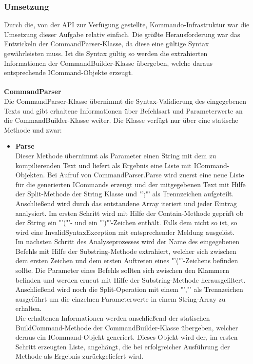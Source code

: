 \subsubsection{Umsetzung}
Durch die, von der API zur Verfügung gestellte, Kommando-Infrastruktur war die Umsetzung dieser Aufgabe relativ einfach. Die größte Herausforderung war das Entwickeln der CommandParser-Klasse, da diese eine gültige Syntax gewährleisten muss. Ist die Syntax gültig so werden die extrahierten Informationen der CommandBuilder-Klasse übergeben, welche daraus entsprechende ICommand-Objekte erzeugt.\\
\\
\textbf{CommandParser}\\
Die CommandParser-Klasse übernimmt die Syntax-Validierung des eingegebenen Texts und gibt erhaltene Informationen über Befehlsart und Parameterwerte an die CommandBuilder-Klasse weiter. Die Klasse verfügt nur über eine statische Methode und zwar:
\begin{itemize}
\item \textbf{Parse}\\
Dieser Methode übernimmt als Parameter einen String mit dem zu kompilierenden Text und liefert als Ergebnis eine Liste mit ICommand-Objekten. 
Bei Aufruf von CommandParser.Parse wird zuerst eine neue Liste für die generierten ICommands erzeugt und der mitgegebenen Text mit Hilfe der Split-Methode der String Klasse und "';"' als Trennzeichen aufgeteilt. Anschließend wird durch das entstandene Array iteriert und jeder Eintrag analysiert. Im ersten Schritt wird mit Hilfe der Contain-Methode geprüft ob der String ein "'("'- und ein "')"'-Zeichen enthält. Falls dem nicht so ist, so wird eine InvalidSyntaxException mit entsprechender Meldung ausgelöst.\\
Im nächsten Schritt des Analyseprozesses wird der Name des eingegebenen Befehls mit Hilfe der Substring-Methode extrahiert, welcher sich zwischen dem ersten Zeichen und dem ersten Auftreten eines "'("'-Zeichens befinden sollte. Die Parameter eines Befehls sollten sich zwischen den Klammern befinden und werden erneut mit Hilfe der Substring-Methode herausgefiltert. Anschließend wird noch die Split-Operation mit einem "',"' als Trennzeichen ausgeführt um die einzelnen Parameterwerte in einem String-Array zu erhalten.\\
Die erhaltenen Informationen werden anschließend der statischen BuildCommand-Methode der CommandBuilder-Klasse übergeben, welcher deraus ein ICommand-Objekt generiert. Dieses Objekt wird der, im ersten Schritt erzeugten Liste, angehängt, die bei erfolgreicher Ausführung der Methode als Ergebnis zurückgeliefert wird.
\end{itemize}
